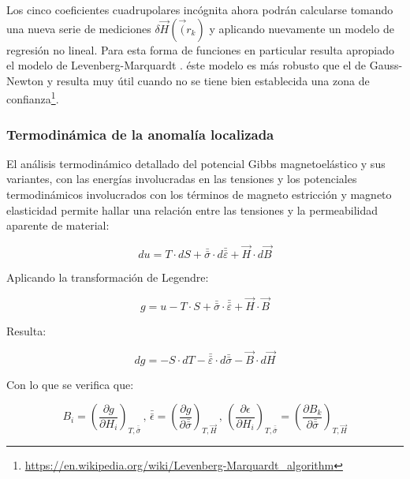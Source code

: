 Los cinco coeficientes cuadrupolares incógnita ahora podrán calcularse tomando una nueva serie de mediciones $\delta\vec{H}(\vec(r_{k}) $ y aplicando nuevamente un modelo de regresión no lineal. Para esta forma de funciones en particular resulta apropiado el modelo de Levenberg-Marquardt \citep{EstimacionNoLineal2}. éste modelo es más robusto que el de Gauss-Newton y resulta muy útil cuando no se tiene bien establecida una zona de confianza\footnote{\url{https://en.wikipedia.org/wiki/Levenberg-Marquardt\_algorithm}}.


\subsubsection{Termodinámica de la anomalía localizada}

El análisis termodinámico detallado del potencial Gibbs magnetoelástico y sus variantes, con las energías involucradas en las tensiones y los potenciales termodinámicos involucrados con los términos de magneto estricción y magneto elasticidad permite hallar una relación entre las tensiones y la permeabilidad aparente de material:

\begin{equation}
	\label{eq:522}
	du = T \cdot dS + \bar{\bar{\sigma}} \cdot d\bar{\bar{\varepsilon}} + \overrightarrow{H} \cdot d \overrightarrow{B}
\end{equation}

Aplicando la transformación de Legendre:

\begin{equation}
	\label{eq:523}
	g = u - T \cdot S  + \bar{\bar{\sigma}} \cdot \bar{\bar{\varepsilon}}  + \overrightarrow{H} \cdot \overrightarrow{B}
\end{equation}

Resulta:

\begin{equation}
	\label{eq:524}
	dg = - S \cdot dT  - \bar{\bar{\varepsilon}} \cdot d\bar{\bar{\sigma}} - \overrightarrow{B} \cdot d\overrightarrow{H}
\end{equation}

Con lo que se verifica que:

\begin{equation}
	\label{eq:525}
	B_{i}=\left(\dfrac{\partial g}{\partial H_{i}} \right)_{T,\bar{\bar{\sigma}}} \, , \,
	\bar{\bar{\epsilon}}=\left(\dfrac{\partial g}{\partial \bar{\bar{\sigma}}} \right)_{T,\overrightarrow{H}} \, , \,
\left(\dfrac{\partial \epsilon}{\partial H_{i}} \right)_{T,\bar{\bar{\sigma}}} = 
\left(\dfrac{\partial B_{k}}{\partial \bar{\bar{\sigma}}} \right)_{T,\overrightarrow{H}}
\end{equation}
	 
